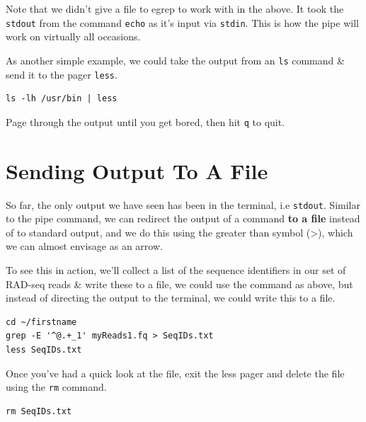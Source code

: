 \documentclass[a4paper,12pt,twoside]{memoir}
\begin{document}
\begin{information}
Note that we didn't give a file to egrep to work with in the above.
It took the \texttt{stdout} from the command \texttt{echo} as it's input via \texttt{stdin}.
This is how the pipe will work on virtually all occasions.
\end{information}

\begin{steps}
As another simple example, we could take the output from an \texttt{ls} command \& send it to the pager \texttt{less}.
\begin{lstlisting}
ls -lh /usr/bin | less
\end{lstlisting}
Page through the output until you get bored, then hit \texttt{q} to quit.
\end{steps}

\section{Sending Output To A File}
\begin{information}
So far, the only output we have seen has been in the terminal, i.e  \texttt{stdout}.
Similar to the pipe command, we can redirect the output of a command \textbf{to a file} instead of to standard output, and we do this using the greater than symbol (\textgreater), which we can almost envisage as an arrow.
\end{information}

\begin{steps}
To see this in action, we'll collect a list of the sequence identifiers in our set of RAD-seq reads \& write these to a file, we could use the command as above, but instead of directing the output to the terminal, we could write this to a file.
\end{steps}
\begin{lstlisting}
cd ~/firstname
grep -E '^@.+_1' myReads1.fq > SeqIDs.txt
less SeqIDs.txt
\end{lstlisting}

Once you've had a quick look at the file, exit the less pager and delete the file using the \texttt{rm} command.
\begin{lstlisting}
rm SeqIDs.txt
\end{lstlisting}
\end{document}
